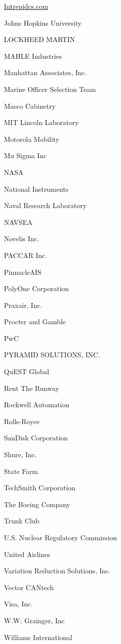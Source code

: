 \documentclass[twoside]{article}
\begin{document}
\begin{center}
\begin{multicols}{5}
\begin{FlushLeft}
\begin{compactitem}
\item \url{Intrepidcs.com}
\item Johns Hopkins University
\item LOCKHEED MARTIN
\item MAHLE Industries
\item Manhattan Associates, Inc.
\item Marine Officer Selection Team
\item Masco Cabinetry
\item MIT Lincoln Laboratory
\item Motorola Mobility
\item Mu Sigma Inc
\item NASA
\item National Instruments
\item Naval Research Laboratory
\item NAVSEA
\item Novelis Inc.
\item PACCAR Inc.
\item PinnacleAIS
\item PolyOne Corporation
\item Praxair, Inc.
\item Procter and Gamble
\item PwC
\item PYRAMID SOLUTIONS, INC.
\item QuEST Global
\item Rent The Runway
\item Rockwell Automation
\item Rolls-Royce
\item SanDisk Corporation
\item Shure, Inc.
\item State Farm
\item TechSmith Corporation
\item The Boeing Company
\item Trunk Club
\item U.S. Nuclear Regulatory Commission
\item United Airlines
\item Variation Reduction Solutions, Inc.
\item Vector CANtech
\item Visa, Inc.
\item W.W. Grainger, Inc
\item Williams International
\end{compactitem}
        \end{FlushLeft}

\end{multicols}
\end{center}
\end{document}
